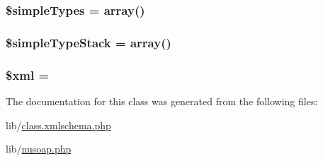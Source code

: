 \subsubsection[{\$simple\+Types}]{\setlength{\rightskip}{0pt plus 5cm}\$simple\+Types = array()}\label{classnusoap__xmlschema_ad887c39157b1519b7c05efeee6364642}
\hypertarget{classnusoap__xmlschema_a53f10697ad642da94db8cf98a2543a2c}{}
\subsubsection[{\$simple\+Type\+Stack}]{\setlength{\rightskip}{0pt plus 5cm}\$simple\+Type\+Stack = array()}\label{classnusoap__xmlschema_a53f10697ad642da94db8cf98a2543a2c}
\hypertarget{classnusoap__xmlschema_aa108d9d91e700ac530401dd363b0723b}{}
\subsubsection[{\$xml}]{\setlength{\rightskip}{0pt plus 5cm}\$xml = \textquotesingle{}\textquotesingle{}}\label{classnusoap__xmlschema_aa108d9d91e700ac530401dd363b0723b}


The documentation for this class was generated from the following files\+:\begin{DoxyCompactItemize}
\item 
lib/\hyperlink{class_8xmlschema_8php}{class.\+xmlschema.\+php}\item 
lib/\hyperlink{nusoap_8php}{nusoap.\+php}\end{DoxyCompactItemize}
